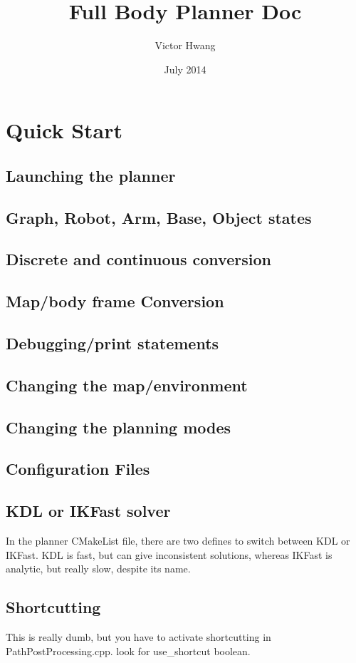 \documentclass{article}
\title{Full Body Planner Doc}
\author{Victor Hwang}
\date{July 2014}
\begin{document}
\maketitle
\tableofcontents
\section{Quick Start}
    \subsection{Launching the planner}
	\subsection{Graph, Robot, Arm, Base, Object states}
	\subsection{Discrete and continuous conversion}
	\subsection{Map/body frame Conversion}
	\subsection{Debugging/print statements}
	\subsection{Changing the map/environment}
	\subsection{Changing the planning modes}
    \subsection{Configuration Files}
    \subsection{KDL or IKFast solver}
        In the planner CMakeList file, there are two defines to switch between
        KDL or IKFast. KDL is fast, but can give inconsistent solutions, whereas
        IKFast is analytic, but really slow, despite its name.
    \subsection{Shortcutting}
        This is really dumb, but you have to activate shortcutting in
        PathPostProcessing.cpp. look for use\_shortcut boolean.
\end{document}
